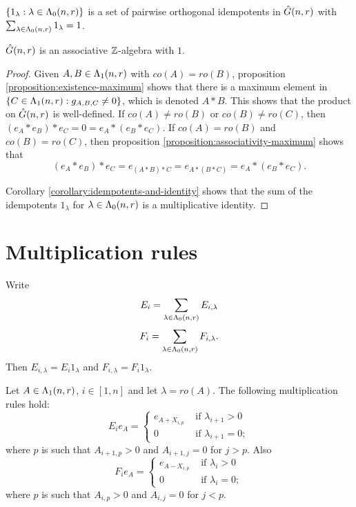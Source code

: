 \documentclass[a4paper, 11pt]{report}
\begin{document}
\begin{corollary}\label{corollary:idempotents-and-identity}
$\{1_\lambda:\lambda\in\Lambda_0(n,r)\}$ is a set of pairwise orthogonal idempotents in $\hat{G}(n,r)$ with $\sum_{\lambda\in\Lambda_0(n,r)}1_\lambda = 1$.
\end{corollary}

\begin{theorem}
$\hat{G}(n,r)$ is an associative $\mathbb{Z}$-algebra with $1$.
\end{theorem}
\begin{proof}
Given $A,B\in\Lambda_1(n,r)$ with $co(A)=ro(B)$, proposition \ref{proposition:existence-maximum} shows that there is a maximum element in $\{C\in\Lambda_1(n,r): g_{A,B,C}\neq 0\}$, which is denoted $A\ast B$. This shows that the product on $\hat{G}(n,r)$ is well-defined. If $co(A)\neq ro(B)$ or $co(B)\neq ro(C)$, then $(e_A\ast e_B)\ast e_C = 0 = e_A\ast (e_B\ast e_C)$. If $co(A)=ro(B)$ and $co(B)=ro(C)$, then proposition \ref{proposition:associativity-maximum} shows that
\begin{equation*}
(e_A\ast e_B)\ast e_C = e_{(A\ast B)\ast C} = e_{A\ast (B\ast C)} = e_A\ast (e_B\ast e_C).
\end{equation*}

Corollary \ref{corollary:idempotents-and-identity} shows that the sum of the idempotents $1_\lambda$ for $\lambda\in\Lambda_0(n,r)$ is a multiplicative identity.
\end{proof}

\section{Multiplication rules}

Write
\begin{equation*}
E_i = \sum_{\lambda\in\Lambda_0(n,r)} E_{i,\lambda}
\end{equation*}
\begin{equation*}
F_i = \sum_{\lambda\in\Lambda_0(n,r)} F_{i,\lambda}.
\end{equation*}
Then $E_{i,\lambda} = E_i 1_\lambda$ and $F_{i,\lambda} = F_i 1_\lambda$.

\begin{lemma}
Let $A\in\Lambda_1(n,r)$, $i\in [1,n]$ and let $\lambda = ro(A)$. The following multiplication rules hold:
\begin{equation*}
E_i e_A = \begin{cases}
e_{A+X_{i,p}} &\text{	if } \lambda_{i+1}>0\\
0 &\text{	if } \lambda_{i+1}=0;
\end{cases}
\end{equation*}
where $p$ is such that $A_{i+1,p}>0$ and $A_{i+1,j}=0$ for $j>p$. Also
\begin{equation*}
F_i e_A = \begin{cases}
e_{A-X_{i,p}} &\text{	if } \lambda_i>0\\
0 &\text{	if } \lambda_i=0;
\end{cases}
\end{equation*}
where $p$ is such that $A_{i,p}>0$ and $A_{i,j}=0$ for $j<p$.
\end{lemma}
\end{document}
